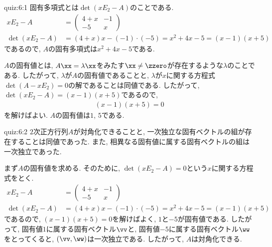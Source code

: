 \begin{answerof}{quiz:6:1}
固有多項式とは$\det(xE_2-A)$のことである.
  \begin{align*}
    xE_2-A&=\begin{pmatrix}4+x&-1\\-5&x\end{pmatrix}\\
    \det(xE_2-A)&=(4+x)x-(-1)\cdot (-5)=x^2+4x-5=(x-1)(x+5)
  \end{align*}
  であるので, $A$の固有多項式は$x^2+4x-5$である.

  $A$の固有値とは, $A\xx=\lambda\xx$をみたす$\xx\neq\zzero$が存在するような$\lambda$のことである.
  したがって, $\lambda$が$A$の固有値であることと, 
  $\lambda$が$x$に関する方程式$\det(A-xE_2)=0$の解であることは同値である.
  したがって, $\det(xE_2-A)=(x-1)(x+5)$であるので,
  \begin{align*}
    (x-1)(x+5)=0
  \end{align*}
  を解けばよい.  $A$の固有値は$1$, $5$である.  
\end{answerof}


\begin{answerof}{quiz:6:2}
  $2$次正方行列$A$が対角化できることと,
  一次独立な固有ベクトルの組が存在することは同値であった.
  また, 相異なる固有値に属する固有ベクトルの組は一次独立であった.
  
  まず$A$の固有値を求める.
  そのために, $\det(xE_2-A)=0$という$x$に関する方程式をとく.
  \begin{align*}
    xE_2-A&=\begin{pmatrix}4+x&-1\\-5&x\end{pmatrix}\\
    \det(xE_2-A)&=(4+x)x-(-1)\cdot(- 5)=x^2+4x-5=(x-1)(x+5)
  \end{align*}
  であるので, $(x-1)(x+5)=0$を解けばよく,
  $1$と$-5$が固有値である.
  したがって,
  固有値$1$に属する固有ベクトル$\vv$と,
  固有値$-5$に属する固有ベクトル$\ww$をとってくると,
  $(\vv,\ww)$は一次独立である.
  したがって, $A$は対角化できる.
\end{answerof}

